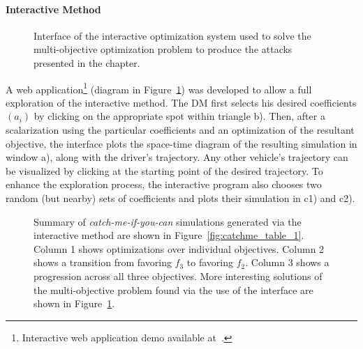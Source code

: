 \paragraph{Interactive Method}


\begin{figure}[t]
\centering
{}%
%

\caption{Interface of the interactive optimization system used to solve the multi-objective optimization problem to produce the attacks presented in the chapter.}

\label{fig:webinterface}
\end{figure}

 A web application\footnote{Interactive web application demo available at~\cite{smartroadswebsite}.} (diagram in Figure~\ref{fig:webinterface}) was developed to allow a full exploration of the interactive method. The DM first selects his desired coefficients $(a_i)$ by clicking on the appropriate spot within triangle b). Then, after a scalarization using the particular coefficients and an optimization of the resultant objective, the interface plots the space-time diagram of the resulting simulation in window a), along with the driver's trajectory. Any other vehicle's trajectory can be visualized by clicking at the starting point of the desired trajectory. To enhance the exploration process, the interactive program also chooses two random (but nearby) sets of coefficients and plots their simulation in c1) and c2).

\begin{figure}[t]
    \centering
    \hfill
    \caption[Summary of \emph{catch-me-if-you-can} simulations generated via the interactive method.]{Summary of \emph{catch-me-if-you-can} simulations generated via the interactive method are shown in Figure~\ref{fig:catchme_table_1}. Column 1 shows optimizations over individual objectives. Column 2 shows a transition from favoring $f_3$ to favoring $f_2$. Column 3 shows a progression across all three objectives. More interesting solutions of the multi-objective problem found via the use of the interface are shown in Figure~\ref{fig:webinterface}.}    
\end{figure}

